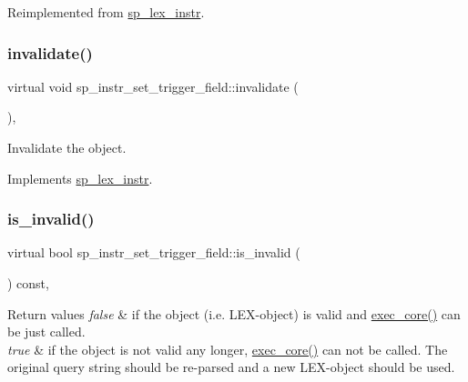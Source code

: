 Reimplemented from \mbox{\hyperlink{classsp__lex__instr_ad355d3ed08ae1fef4811fe6838ed78e2}{sp\+\_\+lex\+\_\+instr}}.

\mbox{\label{classsp__instr__set__trigger__field_ab90045ba709dccc47878abc712db679f}} 
\subsubsection{\texorpdfstring{invalidate()}{invalidate()}}
{\footnotesize\ttfamily virtual void sp\+\_\+instr\+\_\+set\+\_\+trigger\+\_\+field\+::invalidate (\begin{DoxyParamCaption}{ }\end{DoxyParamCaption})\hspace{0.3cm}{\ttfamily [inline]}, {\ttfamily [virtual]}}

Invalidate the object. 

Implements \mbox{\hyperlink{classsp__lex__instr_ae9945d69ab5d91d6ce215f194beea882}{sp\+\_\+lex\+\_\+instr}}.

\mbox{\label{classsp__instr__set__trigger__field_a8bb1d26a072313c690d91bc973d63276}} 
\subsubsection{\texorpdfstring{is\+\_\+invalid()}{is\_invalid()}}
{\footnotesize\ttfamily virtual bool sp\+\_\+instr\+\_\+set\+\_\+trigger\+\_\+field\+::is\+\_\+invalid (\begin{DoxyParamCaption}{ }\end{DoxyParamCaption}) const\hspace{0.3cm}{\ttfamily [inline]}, {\ttfamily [virtual]}}


\begin{DoxyRetVals}{Return values}
{\em false} & if the object (i.\+e. L\+EX-\/object) is valid and \mbox{\hyperlink{classsp__instr__set__trigger__field_abec18ffff701e30c978cbece096e5c72}{exec\+\_\+core()}} can be just called.\\
\hline
{\em true} & if the object is not valid any longer, \mbox{\hyperlink{classsp__instr__set__trigger__field_abec18ffff701e30c978cbece096e5c72}{exec\+\_\+core()}} can not be called. The original query string should be re-\/parsed and a new L\+EX-\/object should be used. \\
\hline
\end{DoxyRetVals}


